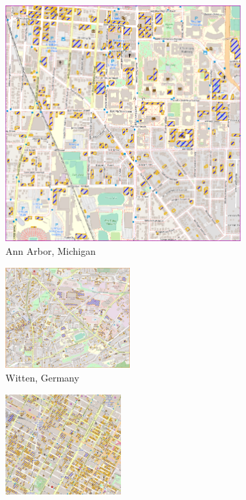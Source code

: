 \begin{figure}[!ht]
 \centering
\begin{subfigure}[b]{0.33\linewidth}
\centering\includegraphics[clip, trim=0.0cm 0.0cm 0.0cm 0.0cm, width=\linewidth]{chapter_5_mapping/imgs/aa-flat-buildings-map.png}
 \caption{Ann Arbor, Michigan}\label{fig:ch5_aa-flat}
\end{subfigure}
\begin{subfigure}[b]{0.33\linewidth}
\centering\includegraphics[clip, trim=0.0cm 0.0cm 0.0cm 0.0cm, width=\linewidth,height=110pt]{chapter_5_mapping/imgs/witten-flat-buildings-map.jpg}
 \caption{Witten, Germany}\label{fig:ch5_wt-flat}
\end{subfigure}
 \begin{subfigure}[b]{0.30\textwidth}
 \centering
 \includegraphics[clip, trim=0.0cm 0.0cm 0.0cm 0.0cm, width=\linewidth,height=110pt]{chapter_5_mapping/imgs/ny-flat-buildings-map.jpg}

\end{subfigure}
\end{figure}
